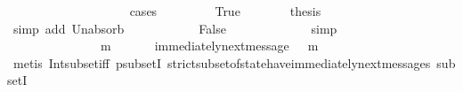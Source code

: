 \begin{isabellebody}
\ {\isachardoublequoteopen}{\isasymsigma}{}\ {\isasymin}\ {\isasymSigma}{\isachardoublequoteclose}\ \ {\isachardoublequoteopen}{\isasymsigma}{}\ {\isasymin}\ {\isasymSigma}{\isachardoublequoteclose}\isanewline
\ \ \isamarkupfalse%
\ {\isachardoublequoteopen}{\isasymsigma}{}\ {\isasymunion}\ {\isasymsigma}{}\ {\isasymin}\ {\isasymSigma}{\isachardoublequoteclose}\isanewline
\ \ \isamarkupfalse%
\ {\isacharparenleft}cases\ {\isachardoublequoteopen}{\isasymsigma}{}\ {\isasymsubseteq}\ {\isasymsigma}{}{\isachardoublequoteclose}{\isacharparenright}\isanewline
\ \ \ \ \isamarkupfalse%
\ True\isanewline
\ \ \ \ \isamarkupfalse%
\ \isamarkupfalse%
\ {\isacharquery}thesis\isanewline
\ \ \ \ \ \ \isamarkupfalse%
\ {\isacharparenleft}simp\ add{\isacharcolon}\ Un{\isacharunderscore}absorb{}\ {\isacartoucheopen}{\isasymsigma}{}\ {\isasymin}\ {\isasymSigma}{\isacartoucheclose}{\isacharparenright}\isanewline
\ \ \isamarkupfalse%
\isanewline
\ \ \ \ \isamarkupfalse%
\ False\isanewline
\ \ \ \ \isamarkupfalse%
\ \isamarkupfalse%
\ {\isachardoublequoteopen}{\isasymnot}\ {\isasymsigma}{}\ {\isasymsubseteq}\ {\isasymsigma}{}{\isachardoublequoteclose}\ \isamarkupfalse%
\ simp\isanewline
\ \ \ \ \isamarkupfalse%
\ {\isachardoublequoteopen}{\isasymforall}\ {\isasymsigma}\ {\isasymin}\ {\isasymSigma}{\isachardot}\ {\isasymforall}\ {\isasymsigma}{\isacharprime}\ {\isasymin}\ {\isasymSigma}{\isachardot}\ {\isasymnot}\ {\isasymsigma}\ {\isasymsubseteq}\ {\isasymsigma}{\isacharprime}\ {\isasymlongrightarrow}\ {\isacharparenleft}{\isasymexists}\ m\ {\isasymin}\ {\isasymsigma}\ {\isacharminus}\ {\isacharparenleft}{\isasymsigma}\ {\isasyminter}\ {\isasymsigma}{\isacharprime}{\isacharparenright}{\isachardot}\ immediately{\isacharunderscore}next{\isacharunderscore}message{\isacharparenleft}{\isasymsigma}\ {\isasyminter}\ {\isasymsigma}{\isacharprime}{\isacharcomma}\ m{\isacharparenright}{\isacharparenright}{\isachardoublequoteclose}\isanewline
\ \ \ \ \ \ \isamarkupfalse%
\ {\isacharparenleft}metis\ Int{\isacharunderscore}subset{\isacharunderscore}iff\ psubsetI\ strict{\isacharunderscore}subset{\isacharunderscore}of{\isacharunderscore}state{\isacharunderscore}have{\isacharunderscore}immediately{\isacharunderscore}next{\isacharunderscore}messages\ subsetI{\isacharparenright}\ \ \isanewline

\end{isabellebody}
